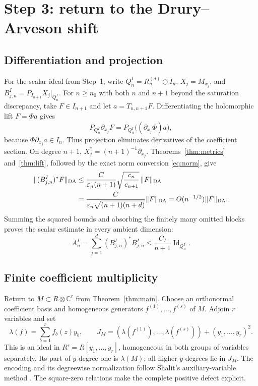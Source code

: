 \documentclass[11pt,reqno]{amsart}
\theoremstyle{remark}
\newcommand{\C}{\mathbb C}
\newcommand{\eps}{\varepsilon}
\newcommand{\DA}{\mathrm{DA}}
\DeclareMathOperator{\Id}{Id}
\begin{document}
\section{Step 3: return to the Drury--Arveson shift}
\label{sec:step-three}

\subsection{Differentiation and projection}
For the scalar ideal from Step~1, write
$Q_n^I=R_n^{(d)}\ominus I_n$, $X_j=M_{x_j}$, and
$B_{j,n}^I=P_{I_{n+1}}X_j|_{Q_n^I}$. For $n\ge n_0$ with
both $n$ and $n+1$ beyond the saturation discrepancy, take
$F\in I_{n+1}$ and let
$a=T_{n,n+1}F$. Differentiating the holomorphic lift $F=\Phi a$ gives
\[
 P_{Q_n^I}\partial_{x_j}F
 =P_{Q_n^I}\bigl((\partial_{x_j}\Phi)a\bigr),
\]
because $\Phi\partial_{x_j}a\in I_n$. Thus projection eliminates
derivatives of the coefficient section. On degree $n+1$,
$X_j^*=(n+1)^{-1}\partial_{x_j}$. Theorems~\ref{thm:metrics}
and~\ref{thm:lift}, followed by the exact norm conversion
\eqref{eq:norm}, give
\begin{align}
\|(B_{j,n}^I)^*F\|_{\DA}
 &\le\frac{C}{\eps_n(n+1)}
       \sqrt{\frac{c_n}{c_{n+1}}}\,\|F\|_{\DA}\notag\\
 &=\frac{C}{\eps_n\sqrt{(n+1)(n+d)}}\|F\|_{\DA}
   =O(n^{-1/2})\|F\|_{\DA}.\label{eq:return}
\end{align}
Summing the squared bounds and absorbing the finitely many omitted
blocks proves the scalar estimate in every ambient dimension:
\begin{equation}\label{eq:scalar-defect}
 A_n^I=\sum_{j=1}^d(B_{j,n}^I)^*B_{j,n}^I
 \le\frac{C_I}{n+1}\Id_{Q_n^I}.
\end{equation}

\subsection{Finite coefficient multiplicity}
Return to $M\subset R\otimes\C^r$ from Theorem~\ref{thm:main}.
Choose an orthonormal coefficient basis and homogeneous generators
$f^{(1)},\ldots,f^{(s)}$ of $M$. Adjoin $r$ variables and set
\begin{equation}\label{eq:encoding}
 \lambda(f)=\sum_{b=1}^r f_b(z)y_b,\qquad
 J_M=(\lambda(f^{(1)}),\ldots,\lambda(f^{(s)}))+(y_1,\ldots,y_r)^2.
\end{equation}
This is an ideal in $R'=R[y_1,\ldots,y_r]$, homogeneous in both
groups of variables separately. Its part of $y$-degree one is
$\lambda(M)$; all higher $y$-degrees lie in $J_M$. The encoding and
its degreewise normalization follow Shalit's auxiliary-variable
method \cite[Section~5, equation~(5.1)]{ShalitDivision}. The
square-zero relations make the complete positive defect explicit.
\end{document}
